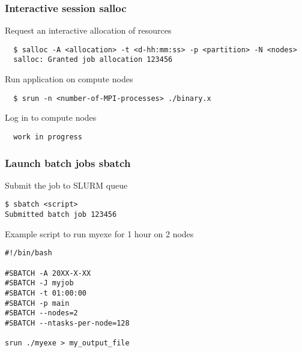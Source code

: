 \begin{frame}[fragile]
\frametitle{Interactive session \hfill \alert{\textbf{salloc}}}

\begin{exampleblock}{Request an interactive allocation of resources}
  \footnotesize
  \begin{verbatim}
  $ salloc -A <allocation> -t <d-hh:mm:ss> -p <partition> -N <nodes>
  salloc: Granted job allocation 123456
  \end{verbatim}
\end{exampleblock}

\begin{exampleblock}{Run application on compute nodes}
  \footnotesize
  \begin{verbatim}
  $ srun -n <number-of-MPI-processes> ./binary.x
  \end{verbatim}
\end{exampleblock}

\begin{exampleblock}{Log in to compute nodes}
  \footnotesize
  \begin{verbatim}
  work in progress
  \end{verbatim}
\end{exampleblock}
  
\end{frame}

\begin{frame}[fragile]
\frametitle{Launch batch jobs \hfill  \alert{\textbf{sbatch}}}
\begin{exampleblock}{Submit the job to SLURM queue}
\footnotesize
\begin{verbatim}
$ sbatch <script>
Submitted batch job 123456
\end{verbatim}
\end{exampleblock}

\begin{exampleblock}{Example script to run myexe for 1 hour on 2 nodes}
\footnotesize
\begin{verbatim}
#!/bin/bash

#SBATCH -A 20XX-X-XX
#SBATCH -J myjob
#SBATCH -t 01:00:00
#SBATCH -p main
#SBATCH --nodes=2
#SBATCH --ntasks-per-node=128

srun ./myexe > my_output_file
\end{verbatim}
\end{exampleblock}

\end{frame}

